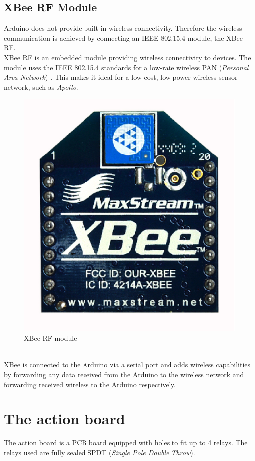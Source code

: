 \documentclass[12pt,a4paper]{report}
\begin{document}
\subsection{XBee RF Module}
Arduino does not provide built-in wireless connectivity. Therefore the wireless communication is achieved by connecting an IEEE 802.15.4 module, the XBee RF.
\ \\
XBee RF is an embedded module providing wireless connectivity to devices. The module uses the IEEE 802.15.4 standards for a low-rate wireless PAN (\textit{Personal Area Network}) \cite{website:xbee}. This makes it ideal for a low-cost, low-power wireless sensor network, such as \emph{Apollo}.
\begin{figure}[H]
    \centering
    \includegraphics*[scale=0.4]{xbee}
    \caption{XBee RF module}
\end{figure}
\ \\
XBee is connected to the Arduino via a serial port and adds wireless capabilities by forwarding any data received from the Arduino to the wireless network and forwarding received wireless to the Arduino respectively.
%
\section{The action board}
The action board is a PCB board equipped with holes to fit up to 4 relays. The relays used are fully sealed SPDT (\textit{Single Pole Double Throw}). \\
\ \\
%
\end{document}
